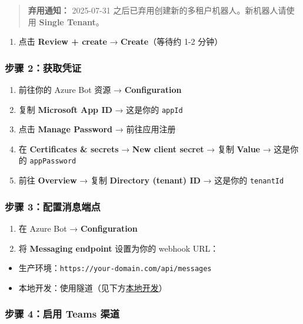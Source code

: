 \begin{quote}
\textbf{弃用通知：} 2025-07-31 之后已弃用创建新的多租户机器人。新机器人请使用 \textbf{Single Tenant}。
\end{quote}


\begin{enumerate}
  \item 点击 \textbf{Review + create} → \textbf{Create}（等待约 1-2 分钟）
\end{enumerate}


\subsubsection{步骤 2：获取凭证}


\begin{enumerate}
  \item 前往你的 Azure Bot 资源 → \textbf{Configuration}
  \item 复制 \textbf{Microsoft App ID} → 这是你的 \texttt{appId}
  \item 点击 \textbf{Manage Password} → 前往应用注册
  \item 在 \textbf{Certificates \& secrets} → \textbf{New client secret} → 复制 \textbf{Value} → 这是你的 \texttt{appPassword}
  \item 前往 \textbf{Overview} → 复制 \textbf{Directory (tenant) ID} → 这是你的 \texttt{tenantId}
\end{enumerate}


\subsubsection{步骤 3：配置消息端点}


\begin{enumerate}
  \item 在 Azure Bot → \textbf{Configuration}
  \item 将 \textbf{Messaging endpoint} 设置为你的 webhook URL：
\end{enumerate}

\begin{itemize}
  \item 生产环境：\texttt{https://your-domain.com/api/messages}
  \item 本地开发：使用隧道（见下方\href{\#local-development-tunneling}{本地开发}）
\end{itemize}


\subsubsection{步骤 4：启用 Teams 渠道}


